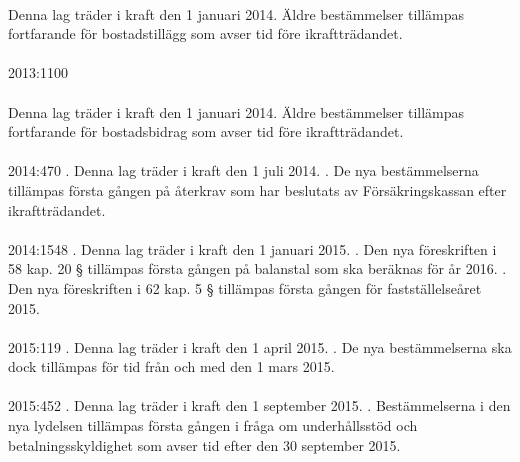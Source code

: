 \documentclass[a4paper,notitlepage,openany,10pt]{book}
\begin{document}
\paragraph*{}
Denna lag träder i kraft den 1 januari 2014. Äldre bestämmelser tillämpas fortfarande för bostadstillägg som avser tid före ikraftträdandet.
\paragraph*{}
2013:1100
\paragraph*{}
Denna lag träder i kraft den 1 januari 2014. Äldre bestämmelser tillämpas fortfarande för bostadsbidrag som avser tid före ikraftträdandet.
\paragraph*{}
2014:470
. Denna lag träder i kraft den 1 juli 2014.
. De nya bestämmelserna tillämpas första gången på återkrav som har beslutats av Försäkringskassan efter ikraftträdandet.
\paragraph*{}
2014:1548
. Denna lag träder i kraft den 1 januari 2015.
. Den nya föreskriften i 58 kap. 20 § tillämpas första gången på balanstal som ska beräknas för år 2016.
. Den nya föreskriften i 62 kap. 5 § tillämpas första gången för fastställelseåret 2015.
\paragraph*{}
2015:119
. Denna lag träder i kraft den 1 april 2015.
. De nya bestämmelserna ska dock tillämpas för tid från och med den 1 mars 2015.
\paragraph*{}
2015:452
. Denna lag träder i kraft den 1 september 2015.
. Bestämmelserna i den nya lydelsen tillämpas första gången i fråga om underhållsstöd och betalningsskyldighet som avser tid efter den 30 september 2015.
\end{document}
